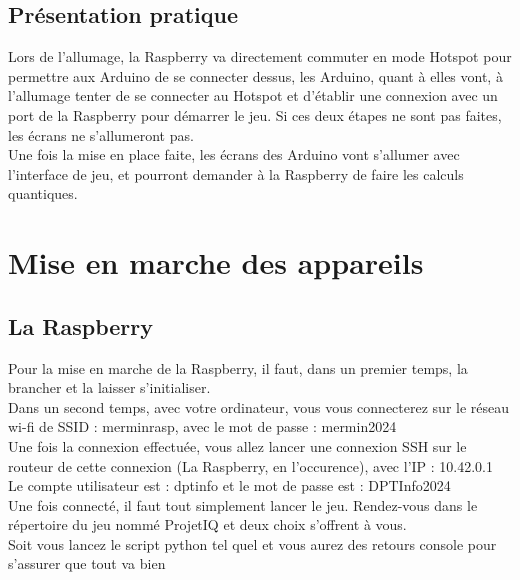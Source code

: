 \documentclass[11pt]{article}
\begin{document}
\subsection{Présentation pratique}

\noindent Lors de l'allumage, la Raspberry va directement commuter en mode Hotspot pour permettre aux Arduino de se connecter dessus, les Arduino, quant à elles vont, à l'allumage tenter de se connecter au Hotspot et d'établir une connexion avec un port de la Raspberry pour démarrer le jeu. Si ces deux étapes ne sont pas faites, les écrans ne s'allumeront pas.
\\

\noindent Une fois la mise en place faite, les écrans des Arduino vont s'allumer avec l'interface de jeu, et pourront demander à la Raspberry de faire les calculs quantiques.


\newpage
\section{Mise en marche des appareils}

\subsection{La Raspberry}

Pour la mise en marche de la Raspberry, il faut, dans un premier temps, la brancher et la laisser s'initialiser.
\\

\noindent Dans un second temps, avec votre ordinateur, vous vous connecterez sur le réseau wi-fi de SSID : merminrasp, avec le mot de passe : mermin2024
\\

\noindent Une fois la connexion effectuée, vous allez lancer une connexion SSH sur le routeur de cette connexion (La Raspberry, en l'occurence), avec l'IP : 10.42.0.1
\\

\noindent Le compte utilisateur est : dptinfo et le mot de passe est : DPTInfo2024
\\

\noindent Une fois connecté, il faut tout simplement lancer le jeu. Rendez-vous dans le répertoire du jeu nommé ProjetIQ et deux choix s'offrent à vous.
\\

\noindent Soit vous lancez le script python tel quel et vous aurez des retours console pour s'assurer que tout va bien 
\end{document}
